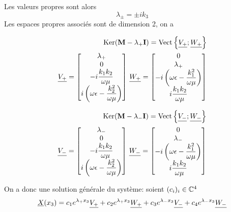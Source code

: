 Les valeurs propres sont alors 
\begin{equation}
    \lambda_\pm = \pm i k_3
\end{equation}
Les espaces propres associés sont de dimension 2, on a 

\begin{align}
\operatorname{Ker}(\mathbf{M}-\lambda_+\mathbf{I})=\operatorname{Vect}\left\lbrace\underline{V_+};\underline{W_+}\right\rbrace \\
    \underline{V_+} = 
    \begin{bmatrix}
    \lambda_+ \\
        0 \\
        -i\dfrac{k_1k_2}{\omega\mu} \\
        i\left(\omega\epsilon - \dfrac{k_2^2}{\omega\mu}\right) \\
    \end{bmatrix}
    \,
    \underline{W_+} = 
        \begin{bmatrix}
        0 \\
        \lambda_+ \\
        -i\left(\omega\epsilon - \dfrac{k_1^2}{\omega\mu}\right) \\
        i\dfrac{k_1k_2}{\omega\mu} \\
    \end{bmatrix}
\end{align}

\begin{align}
\operatorname{Ker}(\mathbf{M}-\lambda_-\mathbf{I})=\operatorname{Vect}\left\lbrace\underline{V_-};\underline{W_-}\right\rbrace\\
    \underline{V_-} = 
    \begin{bmatrix}
        \lambda_- \\
        0 \\
        -i\dfrac{k_1k_2}{\omega\mu} \\
        i\left(\omega\epsilon - \dfrac{k_2^2}{\omega\mu}\right) \\
    \end{bmatrix}
    \,
    \underline{W_-} = 
    \begin{bmatrix}
        0 \\
        \lambda_- \\
        -i\left(\omega\epsilon - \dfrac{k_1^2}{\omega\mu}\right) \\
        i\dfrac{k_1k_2}{\omega\mu} \\
    \end{bmatrix}
\end{align}

On a donc une solution générale du système: soient $(c_i)_{i} \in \mathbb C^4$
\begin{equation}
    \underline{X}(x_3) = c_1e^{\lambda_+ x_3}\underline{V_+}  + c_2e^{\lambda_+ x_3}\underline{W_+} + c_3e^{\lambda_- x_3}\underline{V_-} +c_4e^{\lambda_- x_3}\underline{W_-}
\end{equation}


